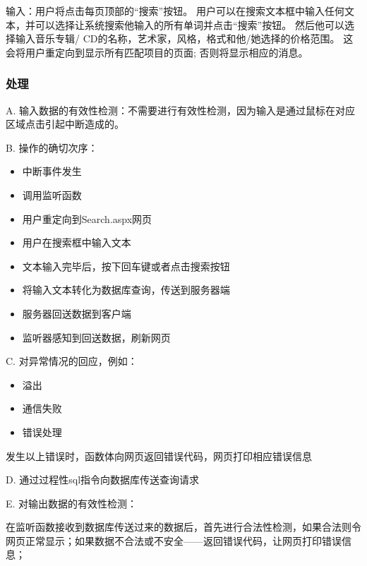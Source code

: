 输入：用户将点击每页顶部的“搜索”按钮。
用户可以在搜索文本框中输入任何文本，并可以选择让系统搜索他输入的所有单词并点击“搜索”按钮。
然后他可以选择输入音乐专辑/ CD的名称，艺术家，风格，格式和他/她选择的价格范围。
这会将用户重定向到显示所有匹配项目的页面; 否则将显示相应的消息。

\subsubsection{处理}



A. 输入数据的有效性检测：不需要进行有效性检测，因为输入是通过鼠标在对应区域点击引起中断造成的。

B. 操作的确切次序：
\begin{adjustwidth}{2cm}{1cm}\qquad
	\begin{itemize}
		\item 中断事件发生
		\item 调用监听函数
		\item 用户重定向到Search.aspx网页
		\item 用户在搜索框中输入文本
		\item 文本输入完毕后，按下回车键或者点击搜索按钮
		\item 将输入文本转化为数据库查询，传送到服务器端
		\item 服务器回送数据到客户端
		\item 监听器感知到回送数据，刷新网页
	\end{itemize}		
\end{adjustwidth}
 

C. 对异常情况的回应，例如：
\begin{adjustwidth}{2cm}{1cm}\qquad
	\begin{itemize}
		\item 溢出
		\item 通信失败
		\item 错误处理
	\end{itemize}		
\end{adjustwidth}

	发生以上错误时，函数体向网页返回错误代码，网页打印相应错误信息

D. 通过过程性sql指令向数据库传送查询请求
		
E. 对输出数据的有效性检测：

在监听函数接收到数据库传送过来的数据后，首先进行合法性检测，如果合法则令网页正常显示；如果数据不合法或不安全——返回错误代码，让网页打印错误信息；

